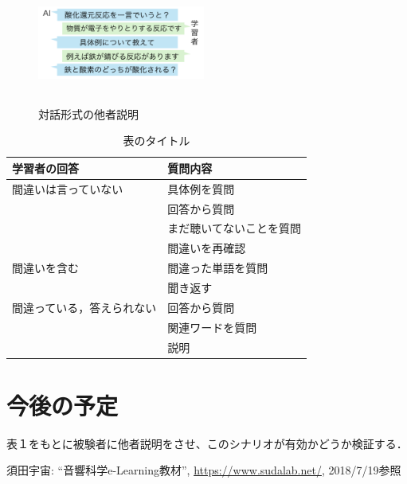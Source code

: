 \documentclass[twocolumn,10pt,a4j]{ltjsarticle}
\begin{document}
\begin{figure}[h]
\begin{center}
 \includegraphics[clip,width=55mm,height=40mm]{talk_log.pdf}
\end{center}
 \caption{対話形式の他者説明}
 \label{fig:図形}
\end{figure}

\begin{table}[h]
\begin{center}
\label{tab:hogehoge}
\begin{tabular}{ll}

\hline

        \multicolumn{1}{l}{学習者の回答} & \multicolumn{1}{l}{質問内容}  \\  \hline \hline 
        \multicolumn{1}{l}{間違いは言っていない} & \multicolumn{1}{l}{具体例を質問} \\ 
         \multicolumn{1}{l}{} & \multicolumn{1}{l}{回答から質問} \\ 
          \multicolumn{1}{l}{} & \multicolumn{1}{l}{まだ聴いてないことを質問} \\ 
          \multicolumn{1}{l}{} & \multicolumn{1}{l}{間違いを再確認} \\ \hline
          \multicolumn{1}{l}{間違いを含む} & \multicolumn{1}{l}{間違った単語を質問} \\
          \multicolumn{1}{l}{} & \multicolumn{1}{l}{聞き返す} \\ \hline
           \multicolumn{1}{l}{間違っている，答えられない} & \multicolumn{1}{l}{回答から質問} \\
          \multicolumn{1}{l}{} & \multicolumn{1}{l}{関連ワードを質問} \\ 
          \multicolumn{1}{l}{} & \multicolumn{1}{l}{説明} \\ \hline
                 
\end{tabular}
\end{center}
\caption{表のタイトル}
\end{table}

\section{今後の予定}
表１をもとに被験者に他者説明をさせ、このシナリオが有効かどうか検証する．





\begin{thebibliography}{99}
 須田宇宙: ``音響科学e-Learning教材'', \url{https://www.sudalab.net/}, 2018/7/19参照
\end{thebibliography}
\end{document}
